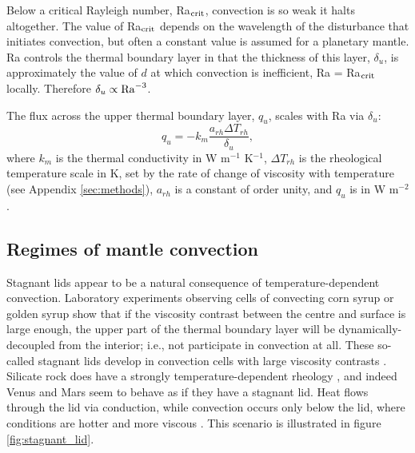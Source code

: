 Below a critical Rayleigh number, Ra$_{\rm crit}$, convection is so weak it halts altogether. The value of Ra$_{\rm crit}$ depends on the wavelength of the disturbance that initiates convection, but often a constant value is assumed for a planetary mantle. Ra controls the thermal boundary layer in that the thickness of this layer, $\delta_u$, is approximately the value of $d$ at which convection is inefficient, Ra = Ra$_{\rm crit}$ locally. Therefore $\delta_u \propto {\rm Ra}^{-3}$.

The flux across the upper thermal boundary layer, $q_u$, scales with Ra via $\delta_u$:
\begin{equation}\label{eq:q_Ra}
q_{u} = -k_m \frac{a_{rh} \Delta T_{rh}}{\delta_{u}},
\end{equation}
where $k_m$ is the thermal conductivity in W m$^{-1}$ K$^{-1}$, $\Delta T_{rh}$ is the rheological temperature scale in K, set by the rate of change of viscosity with temperature (see Appendix \ref{sec:methods}), $a_{rh}$ is a constant of order unity, and $q_u$ is in W m$^{-2}$.




\subsection{Regimes of mantle convection}

Stagnant lids appear to be a natural consequence of temperature-dependent convection. Laboratory experiments observing cells of convecting corn syrup or golden syrup show that if the viscosity contrast between the centre and surface is large enough, the upper part of the thermal boundary layer will be dynamically-decoupled from the interior; i.e., not participate in convection at all. These so-called stagnant lids develop in convection cells with large viscosity contrasts \citep{Davaille1993, Giannandrea1993}. Silicate rock does have a strongly temperature-dependent rheology \citep{Karato1993}, and indeed Venus and Mars seem to behave as if they have a stagnant lid. Heat flows through the lid via conduction, while convection occurs only below the lid, where conditions are hotter and more viscous \citep{Morris1984, Christensen1984, Hansen1993, Solomatov1995}. %
This scenario is illustrated in figure \ref{fig:stagnant_lid}.

